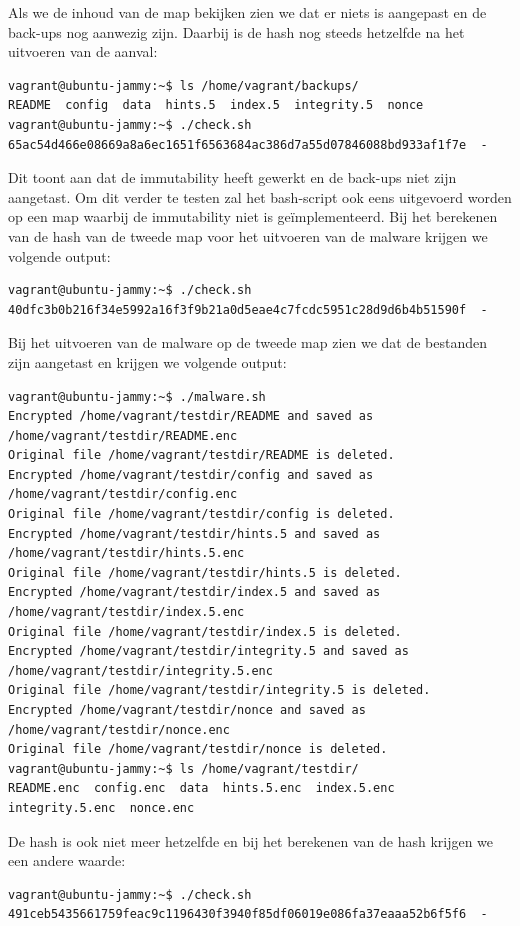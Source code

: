 Als we de inhoud van de map bekijken zien we dat er niets is aangepast en de back-ups nog aanwezig zijn. Daarbij is de hash nog steeds hetzelfde na het uitvoeren van de aanval:
\begin{lstlisting}[language=code, caption={Output voor het tonen van de inhoud en het berekenen van de hash.}]
vagrant@ubuntu-jammy:~$ ls /home/vagrant/backups/
README  config  data  hints.5  index.5  integrity.5  nonce
vagrant@ubuntu-jammy:~$ ./check.sh
65ac54d466e08669a8a6ec1651f6563684ac386d7a55d07846088bd933af1f7e  -
\end{lstlisting}
Dit toont aan dat de immutability heeft gewerkt en de back-ups niet zijn aangetast. Om dit verder te testen zal het bash-script ook eens uitgevoerd worden op een map waarbij de immutability niet is geïmplementeerd. Bij het berekenen van de hash van de tweede map voor het uitvoeren van de malware krijgen we volgende output:
\begin{lstlisting}[language=code, caption={Output na het berkenen van de hash van de tweede map voor de aanval.}]
vagrant@ubuntu-jammy:~$ ./check.sh
40dfc3b0b216f34e5992a16f3f9b21a0d5eae4c7fcdc5951c28d9d6b4b51590f  -
\end{lstlisting}

Bij het uitvoeren van de malware op de tweede map zien we dat de bestanden zijn aangetast en krijgen we volgende output:
\begin{lstlisting}[language=code, caption={Output van het bash-script op de tweede map zonder immutability}]
vagrant@ubuntu-jammy:~$ ./malware.sh
Encrypted /home/vagrant/testdir/README and saved as /home/vagrant/testdir/README.enc
Original file /home/vagrant/testdir/README is deleted.
Encrypted /home/vagrant/testdir/config and saved as /home/vagrant/testdir/config.enc
Original file /home/vagrant/testdir/config is deleted.
Encrypted /home/vagrant/testdir/hints.5 and saved as /home/vagrant/testdir/hints.5.enc
Original file /home/vagrant/testdir/hints.5 is deleted.
Encrypted /home/vagrant/testdir/index.5 and saved as /home/vagrant/testdir/index.5.enc
Original file /home/vagrant/testdir/index.5 is deleted.
Encrypted /home/vagrant/testdir/integrity.5 and saved as /home/vagrant/testdir/integrity.5.enc
Original file /home/vagrant/testdir/integrity.5 is deleted.
Encrypted /home/vagrant/testdir/nonce and saved as /home/vagrant/testdir/nonce.enc
Original file /home/vagrant/testdir/nonce is deleted.
vagrant@ubuntu-jammy:~$ ls /home/vagrant/testdir/
README.enc  config.enc  data  hints.5.enc  index.5.enc  integrity.5.enc  nonce.enc
\end{lstlisting}
De hash is ook niet meer hetzelfde en bij het berekenen van de hash krijgen we een andere waarde:
\begin{lstlisting}[language=code, caption={Output na het berekenen van de hash van de tweede map}]
vagrant@ubuntu-jammy:~$ ./check.sh
491ceb5435661759feac9c1196430f3940f85df06019e086fa37eaaa52b6f5f6  -
\end{lstlisting}

